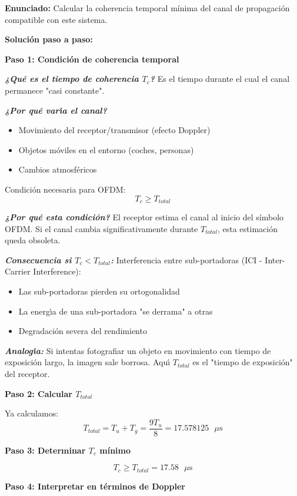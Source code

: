 \documentclass[11pt,a4paper]{article}
\begin{document}
\textbf{Enunciado:} Calcular la coherencia temporal m\'inima del canal de propagaci\'on compatible con este sistema.

\vspace{0.3cm}
\textbf{Soluci\'on paso a paso:}

\textbf{Paso 1: Condici\'on de coherencia temporal}

\textit{\textbf{¿Qu\'e es el tiempo de coherencia $T_c$?}} Es el tiempo durante el cual el canal permanece "casi constante".

\textit{\textbf{¿Por qu\'e var\'{\i}a el canal?}}
\begin{itemize}
    \item Movimiento del receptor/transmisor (efecto Doppler)
    \item Objetos m\'oviles en el entorno (coches, personas)
    \item Cambios atmosf\'ericos
\end{itemize}

Condici\'on necesaria para OFDM:
\[
T_c \geq T_{total}
\]

\textit{\textbf{¿Por qu\'e esta condici\'on?}} El receptor estima el canal al inicio del s\'imbolo OFDM. Si el canal cambia significativamente durante $T_{total}$, esta estimaci\'on queda obsoleta.

\textit{\textbf{Consecuencia si $T_c < T_{total}$:}} Interferencia entre sub-portadoras (ICI - Inter-Carrier Interference):
\begin{itemize}
    \item Las sub-portadoras pierden su ortogonalidad
    \item La energ\'{\i}a de una sub-portadora "se derrama" a otras
    \item Degradaci\'on severa del rendimiento
\end{itemize}

\textit{\textbf{Analog\'{\i}a:}} Si intentas fotografiar un objeto en movimiento con tiempo de exposici\'on largo, la imagen sale borrosa. Aqu\'{\i} $T_{total}$ es el "tiempo de exposici\'on" del receptor.

\textbf{Paso 2: Calcular $T_{total}$}

Ya calculamos:
\[
T_{total} = T_u + T_g = \frac{9T_u}{8} = 17.578125 \text{ }\mu\text{s}
\]

\textbf{Paso 3: Determinar $T_c$ m\'inimo}

\[
\boxed{T_c \geq T_{total} = 17.58 \text{ }\mu\text{s}}
\]

\textbf{Paso 4: Interpretar en t\'erminos de Doppler}
\end{document}
